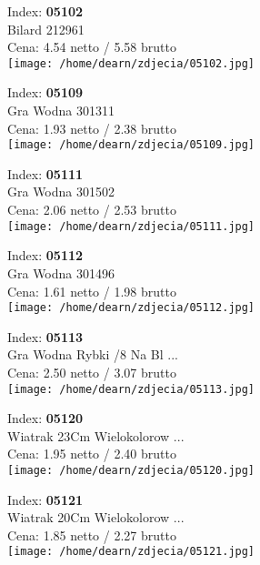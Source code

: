 {Index: \textbf{05102}\\
Bilard   212961\\
Cena: 4.54 netto / 5.58 brutto\\
  \texttt{[image: /home/dearn/zdjecia/05102.jpg]}}\newline\newline

{Index: \textbf{05109}\\
Gra Wodna   301311\\
Cena: 1.93 netto / 2.38 brutto\\
  \texttt{[image: /home/dearn/zdjecia/05109.jpg]}}\newline\newline

{Index: \textbf{05111}\\
Gra Wodna  301502\\
Cena: 2.06 netto / 2.53 brutto\\
  \texttt{[image: /home/dearn/zdjecia/05111.jpg]}}\newline\newline

{Index: \textbf{05112}\\
Gra Wodna   301496\\
Cena: 1.61 netto / 1.98 brutto\\
  \texttt{[image: /home/dearn/zdjecia/05112.jpg]}}\newline\newline

{Index: \textbf{05113}\\
Gra Wodna Rybki  /8 Na Bl ...\\
Cena: 2.50 netto / 3.07 brutto\\
  \texttt{[image: /home/dearn/zdjecia/05113.jpg]}}\newline\newline

{Index: \textbf{05120}\\
Wiatrak 23Cm Wielokolorow ...\\
Cena: 1.95 netto / 2.40 brutto\\
  \texttt{[image: /home/dearn/zdjecia/05120.jpg]}}\newline\newline

{Index: \textbf{05121}\\
Wiatrak 20Cm Wielokolorow ...\\
Cena: 1.85 netto / 2.27 brutto\\
  \texttt{[image: /home/dearn/zdjecia/05121.jpg]}}\newline\newline

